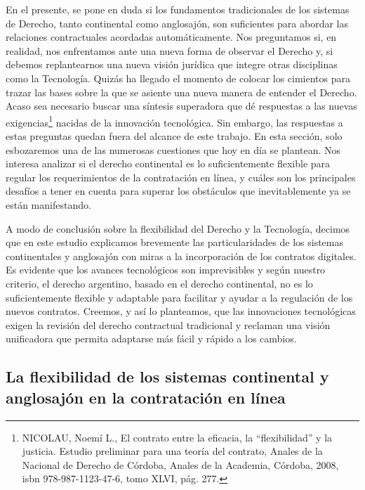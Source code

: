 \documentclass[12pt]{report} %
\begin{document}
En el presente, se pone en duda si los fundamentos tradicionales de los sistemas de Derecho, tanto continental como anglosajón, son suficientes para abordar las relaciones contractuales acordadas automáticamente. Nos preguntamos si, en realidad, nos enfrentamos ante una nueva forma de observar el Derecho y, si debemos replantearnos una nueva visión jurídica que integre otras disciplinas como la Tecnología. Quizás ha llegado el momento de colocar los cimientos para trazar las bases sobre la que se asiente una nueva manera de entender el Derecho. Acaso sea necesario buscar una síntesis superadora que dé respuestas a las nuevas exigencias\footnote{NICOLAU, Noemí L., El contrato entre la eficacia, la “flexibilidad” y la justicia. Estudio preliminar para una teoría del contrato, Anales de la Nacional de Derecho de Córdoba, Anales de la Academia, Córdoba, 2008, isbn 978-987-1123-47-6, tomo XLVI, pág. 277.}  nacidas de la innovación tecnológica. Sin embargo, las respuestas a estas preguntas quedan fuera del alcance de este trabajo. En esta sección, solo esbozaremos una de las numerosas cuestiones que hoy en día se plantean. Nos interesa analizar si el derecho continental es lo suficientemente flexible para regular los requerimientos de la contratación en línea, y cuáles son los principales desafíos a tener en cuenta para superar los obstáculos que inevitablemente ya se están manifestando.

A modo de conclusión sobre la flexibilidad del Derecho y la Tecnología, decimos que en este estudio explicamos brevemente las particularidades de los sistemas continentales y anglosajón con miras a la incorporación de los contratos digitales. Es evidente que los avances tecnológicos son imprevisibles  y según nuestro criterio, el derecho argentino, basado en el derecho continental, no es lo suficientemente  flexible y adaptable para facilitar y ayudar a la regulación de los nuevos contratos. Creemos, y así lo planteamos, que las innovaciones tecnológicas exigen la revisión del derecho contractual tradicional y reclaman una visión unificadora que permita adaptarse más fácil y rápido a los cambios.

\subsection{La flexibilidad de los sistemas continental y anglosajón en  la  contratación  en línea}
\end{document}

